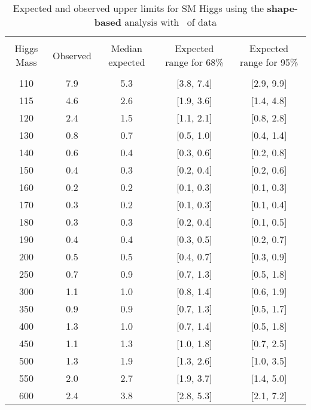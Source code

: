 \begin{table}[hbp!]
\begin{center}
\begin{tabular}{c c c c c}
\hline
\vspace{-3mm} && \\
 Higgs Mass   & Observed & Median expected & Expected range for 68\% & Expected range for 95\%   \\
\vspace{-3mm} && \\
\hline
110 & 7.9 & 5.3 & [3.8, 7.4] & [2.9, 9.9] \\
115 & 4.6 & 2.6 & [1.9, 3.6] & [1.4, 4.8] \\
120 & 2.4 & 1.5 & [1.1, 2.1] & [0.8, 2.8] \\
130 & 0.8 & 0.7 & [0.5, 1.0] & [0.4, 1.4] \\
140 & 0.6 & 0.4 & [0.3, 0.6] & [0.2, 0.8] \\
150 & 0.4 & 0.3 & [0.2, 0.4] & [0.2, 0.6] \\
160 & 0.2 & 0.2 & [0.1, 0.3] & [0.1, 0.3] \\
170 & 0.3 & 0.2 & [0.1, 0.3] & [0.1, 0.4] \\
180 & 0.3 & 0.3 & [0.2, 0.4] & [0.1, 0.5] \\
190 & 0.4 & 0.4 & [0.3, 0.5] & [0.2, 0.7] \\
200 & 0.5 & 0.5 & [0.4, 0.7] & [0.3, 0.9] \\
250 & 0.7 & 0.9 & [0.7, 1.3] & [0.5, 1.8] \\
300 & 1.1 & 1.0 & [0.8, 1.4] & [0.6, 1.9] \\
350 & 0.9 & 0.9 & [0.7, 1.3] & [0.5, 1.7] \\
400 & 1.3 & 1.0 & [0.7, 1.4] & [0.5, 1.8] \\
450 & 1.1 & 1.3 & [1.0, 1.8] & [0.7, 2.5] \\
500 & 1.3 & 1.9 & [1.3, 2.6] & [1.0, 3.5] \\
550 & 2.0 & 2.7 & [1.9, 3.7] & [1.4, 5.0] \\
600 & 2.4 & 3.8 & [2.8, 5.3] & [2.1, 7.2] \\
\hline
\end{tabular}
\caption{Expected and observed upper limits for SM Higgs using the
  {\bf shape-based} analysis with \intlumiEightTeV\ of data}
\label{tab:mvabase_uls}
\end{center}
\end{table}

